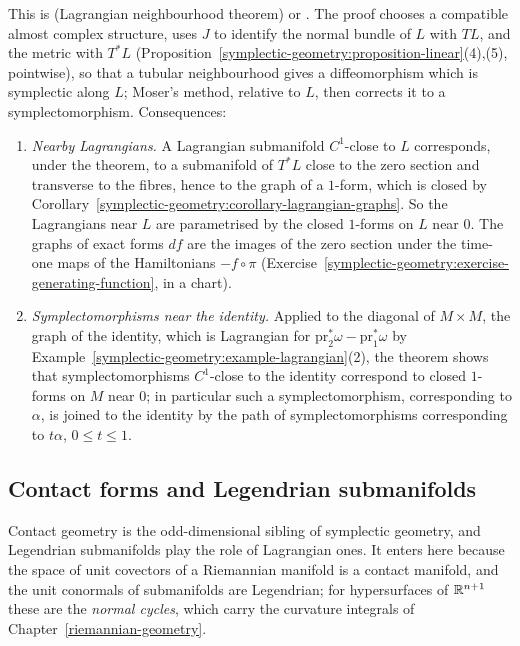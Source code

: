 This is \cite{cannas-da-silva} (Lagrangian neighbourhood theorem) or \cite{mcduff-salamon}. The proof chooses a compatible almost complex structure, uses $J$ to identify the normal bundle of $L$ with $TL$, and the
metric with $T^*L$ (Proposition~\ref{symplectic-geometry:proposition-linear}(4),(5), pointwise), so that a tubular neighbourhood gives a diffeomorphism which is symplectic along $L$; Moser's method, relative to
$L$, then corrects it to a symplectomorphism. Consequences:
\begin{enumerate}
\item \emph{Nearby Lagrangians.} A Lagrangian submanifold $C^1$-close to $L$ corresponds, under the theorem, to a submanifold of $T^*L$ close to the zero section and transverse to the fibres, hence to the graph of a
$1$-form, which is closed by Corollary~\ref{symplectic-geometry:corollary-lagrangian-graphs}. So the Lagrangians near $L$ are parametrised by the closed $1$-forms on $L$ near $0$. The graphs of exact forms
$df$ are the images of the zero section under the time-one maps of the Hamiltonians $-f \circ \pi$ (Exercise~\ref{symplectic-geometry:exercise-generating-function}, in a chart).
\item \emph{Symplectomorphisms near the identity.} Applied to the diagonal of $M \times M$, the graph of the identity, which is Lagrangian for $\mathrm{pr}_2^*\omega - \mathrm{pr}_1^*\omega$ by
Example~\ref{symplectic-geometry:example-lagrangian}(2), the theorem shows that symplectomorphisms $C^1$-close to the identity correspond to closed $1$-forms on $M$ near $0$; in particular such a
symplectomorphism, corresponding to $\alpha$, is joined to the identity by the path of symplectomorphisms corresponding to $t\alpha$, $0 \leq t \leq 1$.
\end{enumerate}

\subsection{Contact forms and Legendrian submanifolds}\label{symplectic-geometry:subsection-contact}

Contact geometry is the odd-dimensional sibling of symplectic geometry, and Legendrian submanifolds play the role of Lagrangian ones. It enters here because the space of unit covectors of a Riemannian
manifold is a contact manifold, and the unit conormals of submanifolds are Legendrian; for hypersurfaces of $\mathbb{R}^{n+1}$ these are the \emph{normal cycles}, which carry the curvature integrals of
Chapter~\ref{riemannian-geometry}.

